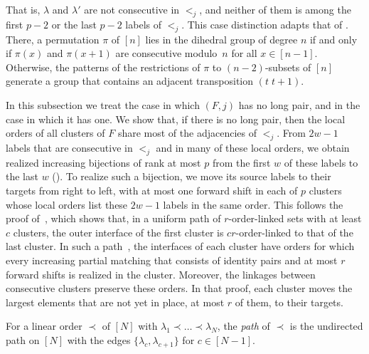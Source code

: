 \documentclass[fontsize=12pt,leading=14pt]{fullpaper}
\begin{document}
That is, $\lambda$ and $\lambda'$ are not consecutive in $<_j$, and neither of them is among the first $p-2$ or the last $p-2$ labels of $<_j$.
This case distinction adapts that of \textcite[Fact~4.1 and Lemma~4.2]{Lehtonen20}.
There, a permutation $\pi$ of $[n]$ lies in the dihedral group of degree $n$ if and only if $\pi(x)$ and $\pi(x+1)$ are consecutive modulo~$n$ for all $x\in[n-1]$.
Otherwise, the patterns of the restrictions of $\pi$ to $(n-2)$-subsets of $[n]$ generate a group that contains an adjacent transposition $(t\;t{+}1)$.

In this subsection we treat the case in which $(F,j)$ has no long pair, and in  the case in which it has one.
We show that, if there is no long pair, then the local orders of all clusters of $F$ share most of the adjacencies of $<_j$.
From $2w-1$ labels that are consecutive in $<_j$ and in many of these local orders, we obtain realized increasing bijections of rank at most $p$ from the first $w$ of these labels to the last $w$ ().
To realize such a bijection, we move its source labels to their targets from right to left, with at most one forward shift in each of $p$ clusters whose local orders list these $2w-1$ labels in the same order.
This follows the proof of~\cite[Lemma~7.7]{HKMM26a}, which shows that, in a uniform path of $r$-order-linked sets with at least $c$ clusters, the outer interface of the first cluster is $cr$-order-linked to that of the last cluster.
In such a path~\cite[definitions~7.1--7.3]{HKMM26a}, the interfaces of each cluster have orders for which every increasing partial matching that consists of identity pairs and at most $r$ forward shifts is realized in the cluster.
Moreover, the linkages between consecutive clusters preserve these orders.
In that proof, each cluster moves the largest elements that are not yet in place, at most $r$ of them, to their targets.

For a linear order $\prec$ of $[N]$ with $\lambda_1\prec\dots\prec\lambda_N$, the \emph{path} of $\prec$ is the undirected path on $[N]$ with the edges $\{\lambda_c,\lambda_{c+1}\}$ for $c\in[N-1]$.
\end{document}
